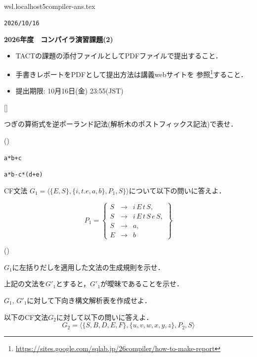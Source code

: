 \\wsl.localhost\Ubuntu-26.04\home\yuen\github\25compiler\exercises\ex241011\ex241011-ans.tex\documentclass[dvipdfmx]{jarticle}
\newcounter{coffee}
\newcounter{bean}
\begin{document}
\begin{flushright}
  \texttt{2026/10/16}
\end{flushright}
\begin{center}{\bf\Large
    2026年度　コンパイラ演習課題(2)
  }\end{center}
\begin{itemize}
  \item TACTの課題の添付ファイルとしてPDFファイルで提出すること．
  \item 手書きレポートをPDFとして提出方法は講義webサイトを
        参照\footnote{\url{https://sites.google.com/sqlab.jp/26compiler/how-to-make-report}}すること．
  \item 提出期限: 10月16日(金) 23:55(JST)
\end{itemize}
\begin{list}{[]}{}
  \item つぎの算術式を逆ポーランド記法(解析木のポストフィックス記法)で表せ．
        \begin{list}{()}{}
          \item \texttt{a*b+c}
          \item \texttt{a*b-c*(d+e)}
        \end{list}
  \item CF文法 $G_1=\langle\{E,S\},\{i,t.e,a,b\},P_1,S\}\rangle$について以下の問いに答えよ．

        \[P_1=\left\{\begin{array}{rcl}
            S & \rightarrow & i\,E\,t\,S,       \\
            S & \rightarrow & i\,E\,t\,S\,e\,S, \\
            S & \rightarrow & a,                \\
            E & \rightarrow & b
          \end{array}\right\}\]
        \begin{list}{()}{}
          \item $G_1$に左括りだしを適用した文法の生成規則を示せ．
          \item 上記の文法を$G'_1$とすると，$G'_1$が曖昧であることを示せ．
          \item $G_1$, $G'_1$に対して下向き構文解析表を作成せよ．
        \end{list}
  \item 以下のCF文法$G_2$に対して以下の問いに答えよ．
        \[G_2=\langle\{S,B,D,E,F\},\{u,v,w,x,y,z\},P_2,S\rangle\]


\end{list}
\end{document}
